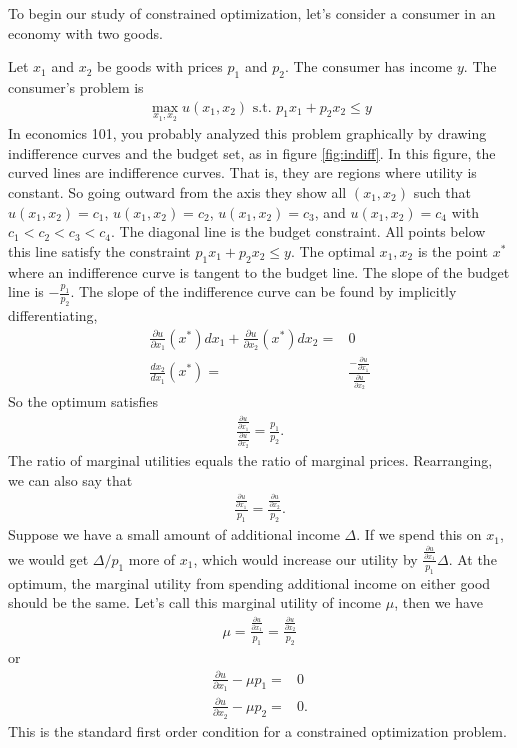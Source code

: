 To begin our study of constrained optimization, let's consider a
consumer in an economy with two goods. 
\begin{example}\label{ex:consumer}
  Let $x_1$ and $x_2$ be goods with prices $p_1$ and $p_2$. The
  consumer has income $y$. The consumer's problem is
  \begin{align*}
    \max_{x_1,x_2} u(x_1,x_2) \text{ s.t. } p_1 x_1 + p_2 x_2 \leq y
  \end{align*}
  In economics 101, you probably analyzed this problem graphically by
  drawing indifference curves and the budget set, as in figure
  \ref{fig:indiff}. In this figure, the curved lines are indifference
  curves. That is, they are regions where utility is constant. So
  going outward from the axis they show all $(x_1,x_2)$ such that
  $u(x_1, x_2) = c_1$, $u(x_1, x_2) = c_2$, $u(x_1, x_2) = c_3$, and
  $u(x_1, x_2) = c_4$ with $c_1 < c_2 < c_3 < c_4$. The diagonal line
  is the budget constraint. All points below this line satisfy the
  constraint $p_1 x_1 + p_2 x_2 \leq y$. The optimal $x_1, x_2$ is the
  point $x^*$ where an indifference curve is tangent to the budget
  line. The slope of the budget line is $-\frac{p_1}{p_2}$. The slope
  of the indifference curve can be found by implicitly
  differentiating,
  \begin{align*}
    \frac{\partial u}{\partial x_1}(x^*) dx_1 + \frac{\partial
      u}{\partial x_2}(x^*) dx_2 = & 0 \\
    \frac{dx_2}{dx_1}(x^*) = & \frac{-\frac{\partial u}{\partial x_1}}
    {\frac{\partial u}{\partial x_2}} 
  \end{align*}
  So the optimum satisfies
  \begin{align*}
    \frac{\frac{\partial u}{\partial x_1}}
    {\frac{\partial u}{\partial x_2}} = \frac{p_1}{p_2}.
  \end{align*}
  The ratio of marginal utilities equals the ratio of marginal
  prices. Rearranging, we can also say that
  \begin{align*}
    \frac{\frac{\partial u}{\partial x_1}}{p_1} = \frac{\frac{\partial u}{\partial x_2}}{p_2}.
  \end{align*}
  Suppose we have a small amount of additional income $\Delta$. If we
  spend this on $x_1$, we would get $\Delta/p_1$ more of $x_1$, which
  would increase our utility by $\frac{\frac{\partial u}{\partial
      x_1}}{p_1} \Delta$. At the optimum, the marginal utility from
  spending additional income on either good should be the same. Let's
  call this marginal utility of income $\mu$, then we have 
  \begin{align*}
    \mu = \frac{\frac{\partial u}{\partial x_1}}{p_1} =
    \frac{\frac{\partial u}{\partial x_2}}{p_2} 
  \end{align*}
  or 
  \begin{align*}
    \frac{\partial u}{\partial x_1} - \mu p_1 = & 0 \\
    \frac{\partial u}{\partial x_2} - \mu p_2 = & 0.
  \end{align*}
  This is the standard first order condition for a constrained
  optimization problem. 
\end{example}

